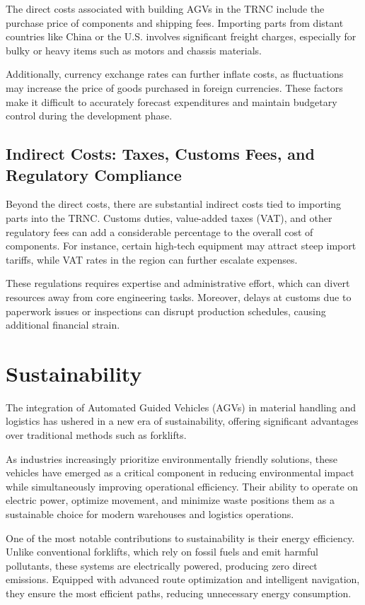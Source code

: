 \documentclass[../../main]{subfiles}
\begin{document}
The direct costs associated with building AGVs in the TRNC include the purchase price of components and shipping fees. 
Importing parts from distant countries like China or the U.S. involves significant freight charges, especially for bulky 
or heavy items such as motors and chassis materials. 

Additionally, currency exchange rates can further inflate costs, as fluctuations may increase the 
price of goods purchased in foreign currencies. These factors make it difficult to accurately 
forecast expenditures and maintain budgetary control during the development phase.

\subsection{Indirect Costs: Taxes, Customs Fees, and Regulatory Compliance}

Beyond the direct costs, there are substantial indirect costs tied to importing parts into the TRNC.
Customs duties, value-added taxes (VAT), and other regulatory fees can add a considerable percentage to 
the overall cost of components. For instance, certain high-tech equipment may attract steep import tariffs, 
while VAT rates in the region can further escalate expenses. 

These regulations requires expertise and administrative effort, 
which can divert resources away from core engineering tasks. Moreover, 
delays at customs due to paperwork issues or inspections can disrupt production schedules, 
causing additional financial strain.

\section{Sustainability}

The integration of Automated Guided Vehicles (AGVs) 
in material handling and logistics has ushered in a new era of sustainability, 
offering significant advantages over traditional methods such as forklifts. 

As industries increasingly prioritize environmentally friendly solutions, 
these vehicles have emerged as a critical component 
in reducing environmental impact while simultaneously improving operational efficiency. 
Their ability to operate on electric power, optimize movement, 
and minimize waste positions them as a sustainable choice 
for modern warehouses and logistics operations.

One of the most notable contributions to sustainability 
is their energy efficiency. 
Unlike conventional forklifts, which rely on fossil fuels 
and emit harmful pollutants, these systems are electrically powered, 
producing zero direct emissions. 
Equipped with advanced route optimization and intelligent navigation, 
they ensure the most efficient paths, reducing unnecessary energy consumption. 
\end{document}
